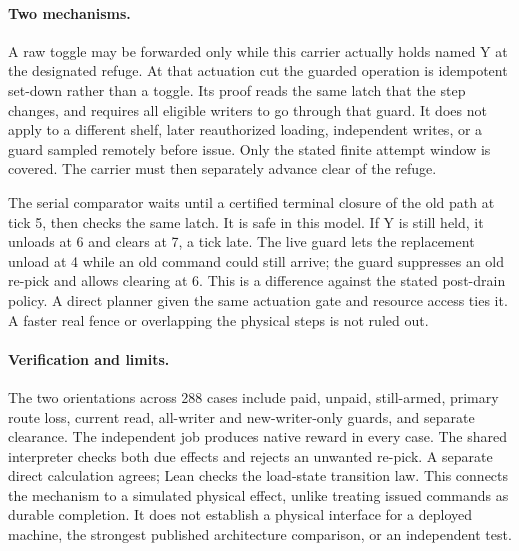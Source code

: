 \documentclass{article}
\begin{document}
\paragraph{Two mechanisms.}
A raw toggle may be forwarded only while this carrier actually holds
named Y at the designated refuge. At that actuation cut the guarded
operation is idempotent set-down rather than a toggle. Its proof reads
the same latch that the step changes, and requires all eligible writers
to go through that guard. It does not apply to a different shelf, later
reauthorized loading, independent writes, or a guard sampled remotely
before issue. Only the stated finite attempt window is covered.
The carrier must then separately advance clear of the refuge.

The serial comparator waits until a certified terminal closure of the
old path at tick 5, then checks the same latch. It is safe in this model.
If Y is still held, it unloads at 6 and clears at 7, a tick late. The live
guard lets the replacement unload at 4 while an old command could still
arrive; the guard suppresses an old re-pick and allows clearing at 6.
This is a difference against the stated post-drain policy. A direct
planner given the same actuation gate and resource access ties it.
A faster real fence or overlapping the physical steps is not ruled out.

\paragraph{Verification and limits.}
The two orientations across 288 cases include paid, unpaid, still-armed,
primary route loss, current read, all-writer and new-writer-only guards,
and separate clearance. The independent job produces native reward in
every case. The shared interpreter checks both due effects and rejects an
unwanted re-pick. A separate direct calculation agrees; Lean checks the
load-state transition law. This connects the mechanism to a simulated
physical effect, unlike treating issued commands as durable completion.
It does not establish a physical interface for a deployed machine,
the strongest published architecture comparison, or an independent test.
\end{document}
